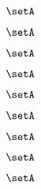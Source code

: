 \begin{forslides}
    \begin{equation}
        \label{eq:slides-translation-161}
        \setA
    \end{equation}

    \begin{equation}
        \label{eq:slides-translation-162}
        \setA
    \end{equation}

    \begin{equation}
        \label{eq:slides-translation-163}
        \setA
    \end{equation}

    \begin{equation}
        \label{eq:slides-translation-164}
        \setA
    \end{equation}

    \begin{equation}
        \label{eq:slides-translation-165}
        \setA
    \end{equation}

    \begin{equation}
        \label{eq:slides-translation-166}
        \setA
    \end{equation}

    \begin{equation}
        \label{eq:slides-translation-167}
        \setA
    \end{equation}

    \begin{equation}
        \label{eq:slides-translation-168}
        \setA
    \end{equation}

    \begin{equation}
        \label{eq:slides-translation-169}
        \setA
    \end{equation}
        
        
    \end{forslides}